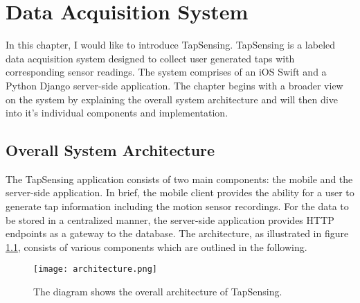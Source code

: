 \chapter{Data Acquisition System\label{cha:chapter3}}
In this chapter, I would like to introduce TapSensing. TapSensing is a labeled data acquisition system designed to collect user generated taps with corresponding sensor readings. The system comprises of an iOS Swift and a Python Django server-side application. The chapter begins with a broader view on the system by explaining the overall system architecture and will then dive into it's individual components and implementation.

\section{Overall System Architecture}

The TapSensing application consists of two main components: the mobile and the server-side application. In brief, the mobile client provides the ability for a user to generate tap information including the motion sensor recordings. For the data to be stored in a centralized manner, the server-side application provides HTTP endpoints as a gateway to the database. The architecture, as illustrated in figure \ref{fig:architecture}, consists of various components which are outlined in the following. \\

\begin{figure}[h!]
  \centering
  \texttt{[image: architecture.png]}
  \caption{The diagram shows the overall architecture of TapSensing.} \label{fig:architecture}
\end{figure}

